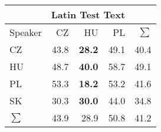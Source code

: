 \begin{tabular}{l|rrr|r}
\hline
 & \multicolumn{3}{c}{Latin Test Text} & \\
\hline
 Speaker   &   CZ &   HU &   PL &   $\sum$ \\
\hline
CZ        & 43.8 & \bf{28.2} & 49.1 &     40.4 \\
HU        & 48.7 & \bf{40.0} & 58.7 &     49.1 \\
PL        & 53.3 & \bf{18.2} & 53.2 &     41.6 \\
SK        & 30.3 & \bf{30.0} & 44.0 &     34.8 \\
\hline
 $\sum$   & 43.9 & 28.9 & 50.8 &     41.2 \\
\hline
\end{tabular}
